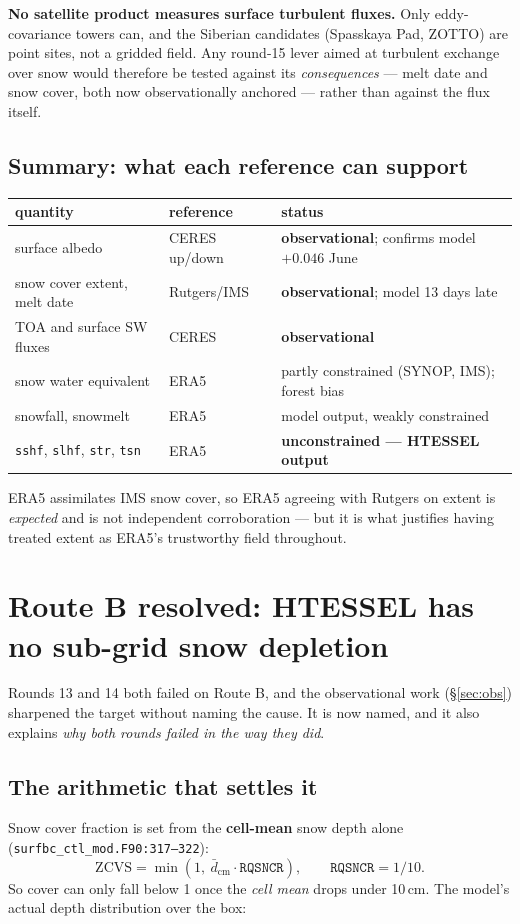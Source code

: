 \documentclass[10pt]{article}
\begin{document}
\textbf{No satellite product measures surface turbulent fluxes.} Only eddy-covariance
towers can, and the Siberian candidates (Spasskaya Pad, ZOTTO) are point sites, not a
gridded field. Any round-15 lever aimed at turbulent exchange over snow would therefore
be tested against its \emph{consequences} --- melt date and snow cover, both now
observationally anchored --- rather than against the flux itself.

\subsection{Summary: what each reference can support}\label{sub:refsummary}
\begin{center}\footnotesize
\begin{tabular}{l l l}
\toprule
quantity & reference & status \\
\midrule
surface albedo & CERES up/down & \textbf{observational}; confirms model $+0.046$ June \\
snow cover extent, melt date & Rutgers/IMS & \textbf{observational}; model 13 days late \\
TOA and surface SW fluxes & CERES & \textbf{observational} \\
snow water equivalent & ERA5 & partly constrained (SYNOP, IMS); forest bias \\
snowfall, snowmelt & ERA5 & model output, weakly constrained \\
\texttt{sshf}, \texttt{slhf}, \texttt{str}, \texttt{tsn} & ERA5 & \textbf{unconstrained --- HTESSEL output} \\
\bottomrule
\end{tabular}
\end{center}

\noindent ERA5 assimilates IMS snow cover, so ERA5 agreeing with Rutgers on extent is
\emph{expected} and is not independent corroboration --- but it is what justifies having
treated extent as ERA5's trustworthy field throughout.

\section{Route B resolved: HTESSEL has no sub-grid snow depletion}\label{sec:scf}
Rounds 13 and 14 both failed on Route B, and the observational work
(\S\ref{sec:obs}) sharpened the target without naming the cause. It is now named,
and it also explains \emph{why both rounds failed in the way they did}.

\subsection{The arithmetic that settles it}\label{sub:scfwhy}
Snow cover fraction is set from the \textbf{cell-mean} snow depth alone
(\texttt{surfbc\_ctl\_mod.F90:317--322}):
\[ \mathrm{ZCVS} = \min\!\left(1,\ \bar{d}_{\mathrm{cm}} \cdot \mathtt{RQSNCR}\right),
   \qquad \mathtt{RQSNCR} = 1/10 . \]
So cover can only fall below 1 once the \emph{cell mean} drops under 10\,cm. The
model's actual depth distribution over the box:
\end{document}
